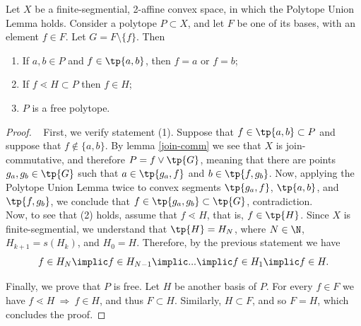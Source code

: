 \documentclass[12pt, a4paper]{article}
\newcommand{\btw}{\lessdot}
\begin{document}
\begin{theorem}\label{th-segm-free}
    Let \(X\) be a finite-segmential, 2-affine convex space, in which the Polytope Union Lemma holds. Consider a polytope \(P \subset X\), and let \(F\) be one of its bases, with an element \(f \in F\). Let \(G = F \setminus \{f\}\). Then

    \begin{enumerate}
        \item If \(a, b \in P\) and \(f \in \tp{a, b}\), then \(f = a\) or \(f = b\);
        \item If \(f \btw H \subset P\) then \(f \in H\);
        \item \(P\) is a free polytope.
    \end{enumerate}
\end{theorem}
\begin{proof}~
    First, we verify statement (1). Suppose that \(f \in \tp{a, b} \subset P\) and suppose that \(f \nin \{a, b\}\). By lemma \ref{join-comm} we see that \(X\) is join-commutative, and therefore \(P = f \vee \tp{G}\), meaning that there are points \(g_a, g_b \in \tp{G}\) such that \(a \in \tp{g_a, f}\) and \(b \in \tp{f, g_b}\). Now, applying the Polytope Union Lemma twice to convex segments \(\tp{g_a, f}\), \(\tp{a, b}\), and \(\tp{f, g_b}\), we conclude that \(f \in \tp{g_a, g_b} \subset \tp{G}\), contradiction.\\

    Now, to see that (2) holds, assume that \(f \btw H\), that is, \(f \in \tp{H}\). Since \(X\) is finite-segmential, we understand that \(\tp{H} = H_N\), where \(N \in \N\), \(H_{k+1} = s(H_k)\), and \(H_0 = H\). Therefore, by the previous statement we have \[f \in H_N \implic f \in H_{N-1} \implic ... \implic f \in H_1 \implic f \in H.\]

    Finally, we prove that \(P\) is free. Let \(H\) be another basis of \(P\). For every \(f \in F\) we have \(f \btw H \ \Rightarrow \ f \in H\), and thus \(F \subset H\). Similarly, \(H \subset F\), and so \(F = H\), which concludes the proof.
\end{proof}
\end{document}
